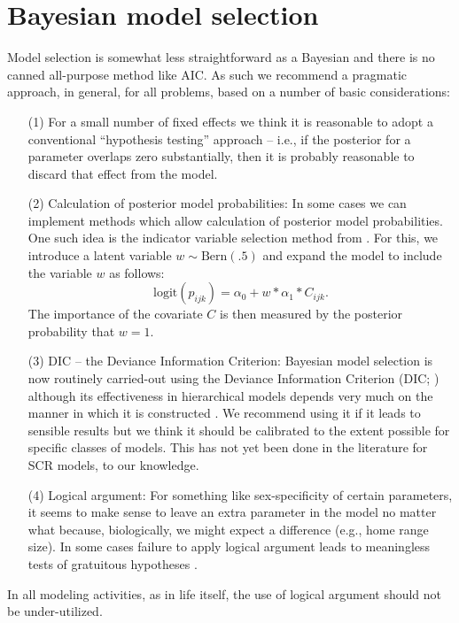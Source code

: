 \section{Bayesian model selection}

Model selection is somewhat less straightforward as a Bayesian and
there is no canned all-purpose method like AIC. As such we
recommend a pragmatic approach, in general, for all problems,
based on a number of basic considerations:
\begin{itemize}
\item[(1)] For a small number of fixed effects we think it is
  reasonable to adopt a conventional ``hypothesis testing'' approach
  -- i.e., if the posterior for a parameter overlaps zero
  substantially, then it is probably reasonable to discard that
  effect from the model.
\item[(2)] Calculation of posterior model probabilities: In some cases
  we can implement methods which allow calculation of posterior model
  probabilities. One such idea is the indicator variable selection
  method from \citet{kuo_mallick:1998}.  For this, we introduce a latent
  variable $w \sim \mbox{Bern}(.5)$ and expand the model to include
  the variable $w$ as follows:
\[
 \mbox{logit}(p_{ijk}) = \alpha_{0} + w*\alpha_{1}*C_{ijk}.
\]
The importance of the covariate $C$ is then measured by the posterior
probability that $w=1$.
\item[(3)] DIC -- the Deviance Information Criterion: Bayesian model
  selection is now routinely carried-out using the Deviance
  Information Criterion (DIC; \citet{spiegelhalter_etal:2002})
  although its
  effectiveness in hierarchical models depends very much on the manner
  in which it is constructed \citep{millar:2009}.  We recommend using
  it if it leads to sensible results but we think it should be
  calibrated to the extent possible for specific classes of models.
  This has not yet been done in the literature for SCR models, to our knowledge.
\item[(4)] Logical argument: For something like sex-specificity of
  certain parameters, it seems to make sense to leave an extra
  parameter in the model no matter what because, biologically, we might
 expect a difference (e.g., home range size).
In some cases failure to apply logical argument leads to
  meaningless tests of gratuitous hypotheses \citep{johnson:1999}.
\end{itemize}
In all modeling activities, as in life itself, the use of logical argument should not be under-utilized.

